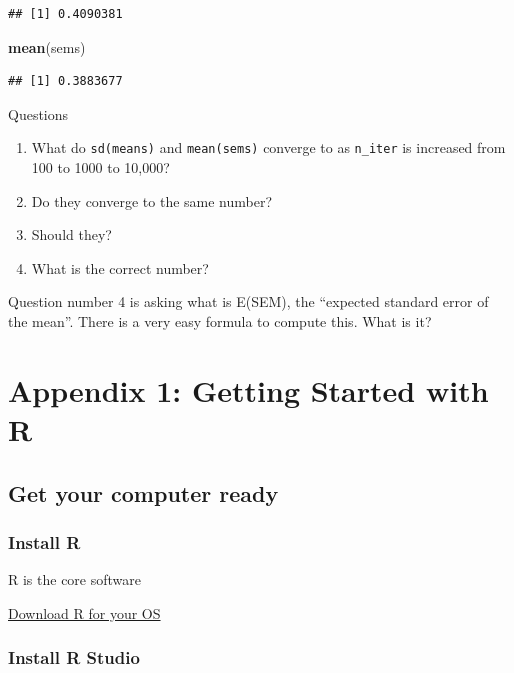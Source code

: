\documentclass[]{book}
\newenvironment{Shaded}{\begin{snugshade}}{\end{snugshade}}
\newcommand{\KeywordTok}[1]{\textcolor[rgb]{0.13,0.29,0.53}{\textbf{#1}}}
\newcommand{\NormalTok}[1]{#1}
\providecommand{\tightlist}{%
  \setlength{\itemsep}{0pt}\setlength{\parskip}{0pt}}
\theoremstyle{definition}
\theoremstyle{definition}
\theoremstyle{definition}
\theoremstyle{remark}
\begin{document}
\begin{verbatim}
## [1] 0.4090381
\end{verbatim}

\begin{Shaded}
\begin{Highlighting}[]
\KeywordTok{mean}\NormalTok{(sems)}
\end{Highlighting}
\end{Shaded}

\begin{verbatim}
## [1] 0.3883677
\end{verbatim}

Questions

\begin{enumerate}
\def\labelenumi{\arabic{enumi}.}
\tightlist
\item
  What do \texttt{sd(means)} and \texttt{mean(sems)} converge to as
  \texttt{n\_iter} is increased from 100 to 1000 to 10,000?
\item
  Do they converge to the same number?
\item
  Should they?
\item
  What is the correct number?
\end{enumerate}

Question number 4 is asking what is E(SEM), the ``expected standard
error of the mean''. There is a very easy formula to compute this. What
is it?

\chapter*{Appendix 1: Getting Started with
R}\label{appendix-1-getting-started-with-r}

\section{Get your computer ready}\label{get-your-computer-ready}

\subsection{Install R}\label{install-r}

R is the core software

\href{https://cran.r-project.org}{Download R for your OS}

\subsection{Install R Studio}\label{install-r-studio}
\end{document}
